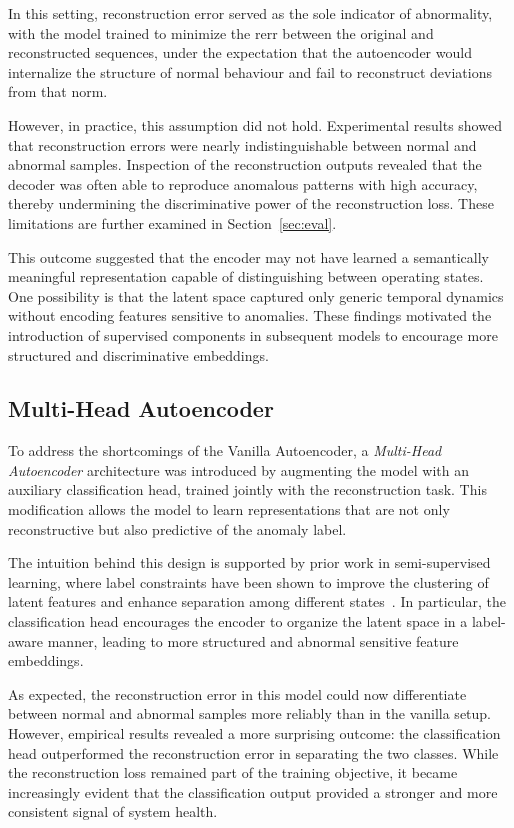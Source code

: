 In this setting, reconstruction error served as the sole indicator of abnormality, with the model trained to minimize the \gls{rerr} between the original and reconstructed sequences, under the expectation that the autoencoder would internalize the structure of normal behaviour and fail to reconstruct deviations from that norm.

However, in practice, this assumption did not hold.
Experimental results showed that reconstruction errors were nearly indistinguishable between normal and abnormal samples. 
Inspection of the reconstruction outputs revealed that the decoder was often able to reproduce anomalous patterns with high accuracy, thereby undermining the discriminative power of the reconstruction loss.
These limitations are further examined in Section~\ref{sec:eval}.

This outcome suggested that the encoder may not have learned a semantically meaningful representation capable of distinguishing between operating states.
One possibility is that the latent space captured only generic temporal dynamics without encoding features sensitive to anomalies.
These findings motivated the introduction of supervised components in subsequent models to encourage more structured and discriminative embeddings.


\subsection{Multi-Head Autoencoder}
\label{subsec:multihead-model}
To address the shortcomings of the Vanilla Autoencoder, a \emph{Multi-Head Autoencoder} architecture was introduced by augmenting the model with an auxiliary classification head, trained jointly with the reconstruction task.
This modification allows the model to learn representations that are not only reconstructive but also predictive of the anomaly label.

The intuition behind this design is supported by prior work in semi-supervised learning, where label constraints have been shown to improve the clustering of latent features and enhance separation among different states~\citep{gao_newly_2021}.
In particular, the classification head encourages the encoder to organize the latent space in a label-aware manner, leading to more structured and abnormal sensitive feature embeddings.

As expected, the reconstruction error in this model could now differentiate between normal and abnormal samples more reliably than in the vanilla setup.
However, empirical results revealed a more surprising outcome: the classification head outperformed the reconstruction error in separating the two classes.
While the reconstruction loss remained part of the training objective, it became increasingly evident that the classification output provided a stronger and more consistent signal of system health.

